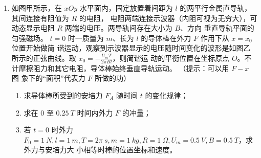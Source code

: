 \begin{enumerate}
\newpage
\item
如图甲所示，在 $ xOy $ 水平面内，固定放置着间距为 $ l $ 的两平行金属直导轨，其间连接有阻值为 $ R $ 的电阻，
电阻两端连接示波器（内阻可视为无穷大），可动态显示电阻 $ R $ 两端的电压。两导轨间存在大小为 $ B $、方向
垂直导轨平面的匀强磁场。 $ t=0 $ 时一质量为 $ m $、长为 $ l $ 的导体棒在外力 $ F $ 作用下从 $ x=x_{0} $位置开始做简
谐运动，观察到示波器显示的电压随时间变化的波形是如图乙所示的正弦曲线。取 $x_{0}=-\frac{U_{m} T}{2 \pi B l}$，则简谐运
动的平衡位置在坐标原点 $ O $。不计摩擦阻力和其它电阻，导体棒始终垂直导轨运动。
（提示：可以用 $ F-x $ 图
象下的“面积”代表力 $ F $ 所做的功）
\begin{enumerate}
\item
求导体棒所受到的安培力 $ F_{A} $ 随时间 $ t $ 的变化规律；
\item 
求在 $ 0 $ 至 $ 0.25 \ T $ 时间内外力 $ F $ 的冲量；
\item 
若 $ t=0 $ 时外力 $ F_0=1 \ N,l=1 \ m,T=2 \pi \ s,m=1 \ kg,R=1 \ \Omega ,U_{m}=0.5 \ V ,B=0.5 \ T $，求外力与安培力大
小相等时棒的位置坐标和速度。

\end{enumerate}
\begin{figure}[h!]
\flushright 
\begin{subfigure}{0.4\linewidth}
\centering
 
\caption{}\label{}
\end{subfigure}
\begin{subfigure}{0.4\linewidth}
\centering
 
\caption{}\label{}
\end{subfigure}	
\end{figure}







\end{enumerate}
